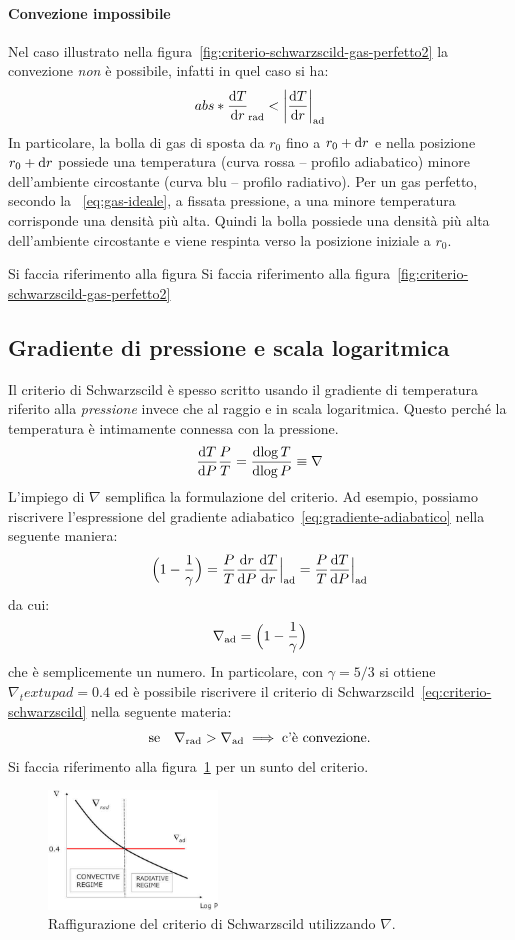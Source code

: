 \paragraph{Convezione impossibile}
Nel caso illustrato nella figura~\ref{fig:criterio-schwarzscild-gas-perfetto2} la convezione \emph{non} è possibile, infatti in quel caso si ha:
\[
abs*{\dfrac{\ud T}{\ud r}}_\textup{rad} < \abs*{\dfrac{\ud T}{\ud r}}_\textup{ad}
\]
In particolare, la bolla di gas di sposta da $r_0$ fino a $r_0 + \ud r$ e nella posizione $r_0 + \ud r$ possiede una temperatura (curva rossa -- profilo adiabatico) minore dell'ambiente circostante (curva blu -- profilo radiativo). Per un gas perfetto, secondo la ~\eqref{eq:gas-ideale}, a fissata pressione, a una minore temperatura corrisponde una densità più alta. Quindi la bolla possiede una densità più alta dell'ambiente circostante e viene respinta verso la posizione iniziale a $r_0$.


Si faccia riferimento alla figura
Si faccia riferimento alla figura~\ref{fig:criterio-schwarzscild-gas-perfetto2}

\subsection{Gradiente di pressione e scala logaritmica}
Il criterio di Schwarzscild è spesso scritto usando il gradiente di temperatura riferito alla \emph{pressione} invece che al raggio e in scala logaritmica. Questo perché la temperatura è intimamente connessa con la pressione.
\begin{equation}
    \dfrac{\ud T}{\ud P} \dfrac{P}{T} = \dfrac{\ud \log T}{\ud \log P} \equiv \nabla
\end{equation}
L'impiego di $\nabla$ semplifica la formulazione del criterio. Ad esempio, possiamo riscrivere l'espressione del gradiente adiabatico~\eqref{eq:gradiente-adiabatico} nella seguente maniera:
\[
\Bigl(1- \frac{1}{\gamma}\Bigr) = \dfrac{P}{T} \dfrac{\ud r}{\ud P} \dfrac{\ud T}{\ud r}\Big|_\textup{ad} = \dfrac{P}{T} \dfrac{\ud T}{\ud P}\Big|_\textup{ad}
\]
da cui:
\begin{equation}
    \nabla_\textup{ad} = \Bigl(1- \frac{1}{\gamma}\Bigr)
\end{equation}
che è semplicemente un numero. In particolare, con $\gamma = 5/3$ si ottiene $\nabla_textup{ad} = 0.4$ ed è possibile riscrivere il criterio di Schwarzscild~\eqref{eq:criterio-schwarzscild} nella seguente materia:
\begin{equation}\label{eq:criterio-schwarzscild-nabla}
    \text{se} \quad \nabla_\textup{rad} > \nabla_\textup{ad} \implies \text{c'è convezione.}
\end{equation}
Si faccia riferimento alla figura~\ref{fig:criterio-schwarzscild-nabla} per un sunto del criterio.

\begin{figure}
\centering
\includegraphics[width=0.4\textwidth]{immagini/criterio-schwarzscild-nabla.jpg}
\caption{Raffigurazione del criterio di Schwarzscild utilizzando $\nabla$.}
\label{fig:criterio-schwarzscild-nabla}
\end{figure}
